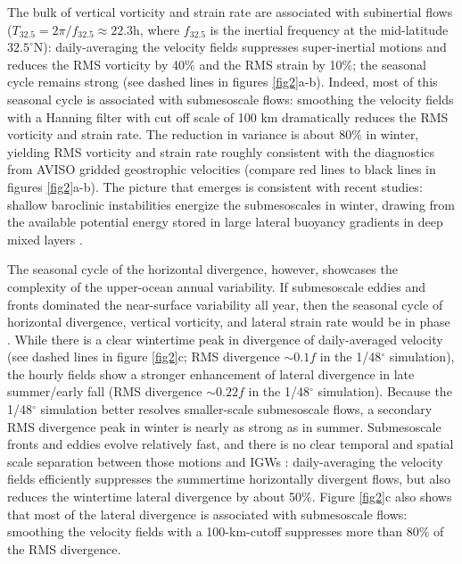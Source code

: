 \documentclass[grl]{agutex2015}
\begin{document}
\begin{article}
The bulk of vertical vorticity and strain rate are associated with subinertial flows
($T_{32.5} = 2\pi/f_{32.5}\approx 22.3$h, where $f_{32.5}$ is the inertial frequency at
the  mid-latitude $32.5^\circ$N): daily-averaging the velocity fields suppresses super-inertial
motions and reduces the RMS
vorticity by 40$\%$ and the RMS strain by 10$\%$; the seasonal
cycle remains strong (see
dashed lines in figures \ref{fig2}a-b). Indeed, most of this seasonal cycle is associated
with submesoscale flows: smoothing the velocity fields
with a Hanning filter with cut off scale of 100 km dramatically reduces the RMS
vorticity and strain rate. The reduction in variance is about 80$\%$ in winter,
yielding RMS vorticity and strain  rate roughly consistent with the diagnostics from
AVISO gridded geostrophic velocities (compare red lines to black lines in figures \ref{fig2}a-b).
The picture that emerges is consistent with recent studies: shallow baroclinic
instabilities energize the submesoscales in winter, drawing from the available
potential energy stored in large lateral buoyancy gradients in deep mixed layers \citep{sasaki_etal2014,callies_etal2015,callies_etal2016}.

The seasonal cycle of the horizontal divergence, however, showcases the complexity
of the upper-ocean annual variability. If submesoscale eddies and fronts dominated
the near-surface variability all year, then the seasonal cycle of horizontal divergence,
vertical vorticity, and lateral strain rate would be in phase \citep[e.g.,][]{sasaki_etal2014}.
While there is a clear wintertime peak in divergence of daily-averaged velocity
(see dashed lines in figure \ref{fig2}c; RMS divergence $\sim0.1 f$ in the 1/48$^\circ$
simulation), the hourly fields show
a stronger enhancement of
lateral divergence in late summer/early fall (RMS divergence $\sim0.22 f$ in the 1/48$^\circ$
simulation). Because the 1/48$^\circ$ simulation better resolves
smaller-scale submesoscale flows, a secondary RMS divergence peak in winter  is
nearly as strong as in summer. Submesoscale fronts and eddies evolve
relatively fast, and there is no clear
temporal and spatial scale separation between those motions and IGWs
\citep[][]{mcwilliams2016}:
daily-averaging the velocity fields efficiently suppresses the summertime horizontally
divergent flows, but also reduces the wintertime lateral divergence by about 50$\%$.
Figure \ref{fig2}c also shows that most of the lateral divergence is associated
with submesoscale flows: smoothing the velocity fields with a 100-km-cutoff
suppresses more than 80$\%$ of the RMS divergence.



\end{article}
\end{document}
